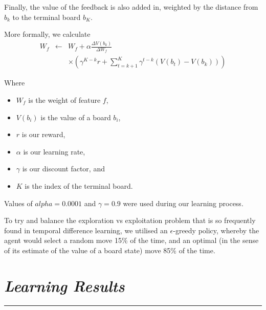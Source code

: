 \documentclass[10pt]{report}
\begin{document}
\begin{multicols}{2}
Finally, the value of the feedback is also added in, weighted by the distance from $b_k$ to the terminal board $b_K$.

More formally, we calculate 
\begin{eqnarray}
	W_f  & \leftarrow & W_f + \alpha \frac{\Delta V(b_k)}{\Delta W_f} \nonumber  \\
	&&  \times \left(\gamma^{K-k}r + \sum_{t=k+1}^K \gamma^{t-k}\left(V(b_t) - V(b_k)\right)\right) \nonumber
\end{eqnarray}

Where
   \begin{itemize}
  \item
  	$W_f$ is the weight of feature $f$,
  \item
	$V(b_i)$ is the value of a board $b_i$,
  \item
	$r$ is our reward,
 \item
	$\alpha$ is our learning rate,
  \item
	$\gamma$ is our discount factor, and
  \item
	$K$ is the index of the terminal board.
  \end{itemize}

Values of $alpha = 0.0001$ and $\gamma = 0.9$ were used during our learning process.

To try and balance the exploration vs exploitation problem that is so frequently found in temporal difference learning, we utilised an $\epsilon$-greedy policy, whereby the agent would select a random move 15\% of the time, and an optimal (in the sense of its estimate of the value of a board state) move 85\% of the time.
\section*{\emph{\textmd{Learning Results}}}
\hrule


\end{multicols}
\end{document}
